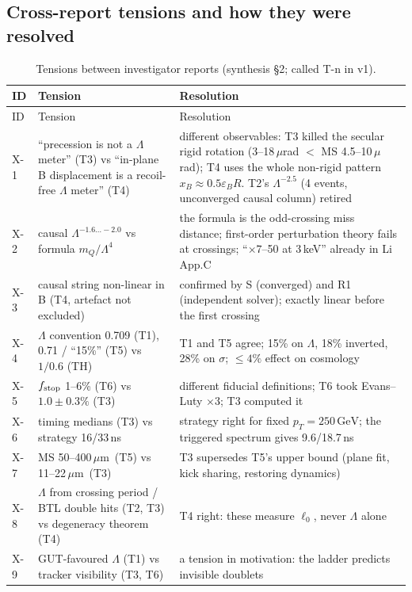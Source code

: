 \documentclass[11pt,a4paper]{article}
\newcommand{\mQ}{m_Q}
\newcommand{\GeV}{\ensuremath{\,\mathrm{GeV}}}
\newcommand{\um}{\ensuremath{\,\mu\mathrm{m}}}
\begin{document}
\subsection{Cross-report tensions and how they were resolved}
{\footnotesize
\begin{longtable}{@{}L{0.7cm}L{5.4cm}L{10.2cm}@{}}
\caption{Tensions between investigator reports (synthesis \S2; called T-n in v1).}\label{tab:tensions}\\
\toprule ID & Tension & Resolution\\\midrule\endfirsthead
\toprule ID & Tension & Resolution\\\midrule\endhead
\bottomrule\endfoot
X-1 & ``precession is not a $\Lambda$ meter'' (T3) vs ``in-plane B displacement is a recoil-free $\Lambda$ meter'' (T4) & different observables: T3 killed the secular rigid rotation (3--18\,$\mu$rad $<$ MS 4.5--10\,$\mu$rad); T4 uses the whole non-rigid pattern $x_B\approx0.5\varepsilon_BR$. T2's $\Lambda^{-2.5}$ (4 events, unconverged causal column) retired\\
X-2 & causal $\Lambda^{-1.6\ldots-2.0}$ vs formula $\mQ/\Lambda^4$ & the formula is the odd-crossing miss distance; first-order perturbation theory fails at crossings; ``$\times7$--50 at 3\,keV'' already in Li App.C\\
X-3 & causal string non-linear in B (T4, artefact not excluded) & confirmed by S (converged) and R1 (independent solver); exactly linear before the first crossing\\
X-4 & $\Lambda$ convention 0.709 (T1), 0.71 / ``15\%'' (T5) vs $1/0.6$ (TH) & T1 and T5 agree; 15\% on $\Lambda$, 18\% inverted, 28\% on $\sigma$; $\le4\%$ effect on cosmology\\
X-5 & $f_{\rm stop}$ 1--6\% (T6) vs $1.0\pm0.3\%$ (T3) & different fiducial definitions; T6 took Evans--Luty $\times3$; T3 computed it\\
X-6 & timing medians (T3) vs strategy 16/33\,ns & strategy right for fixed $p_T=250\GeV$; the triggered spectrum gives 9.6/18.7\,ns\\
X-7 & MS 50--400\um\ (T5) vs 11--22\um\ (T3) & T3 supersedes T5's upper bound (plane fit, kick sharing, restoring dynamics)\\
X-8 & $\Lambda$ from crossing period / BTL double hits (T2, T3) vs degeneracy theorem (T4) & T4 right: these measure $\ell_0$, never $\Lambda$ alone\\
X-9 & GUT-favoured $\Lambda$ (T1) vs tracker visibility (T3, T6) & a tension in motivation: the ladder predicts invisible doublets\\

\end{longtable}}
\end{document}
